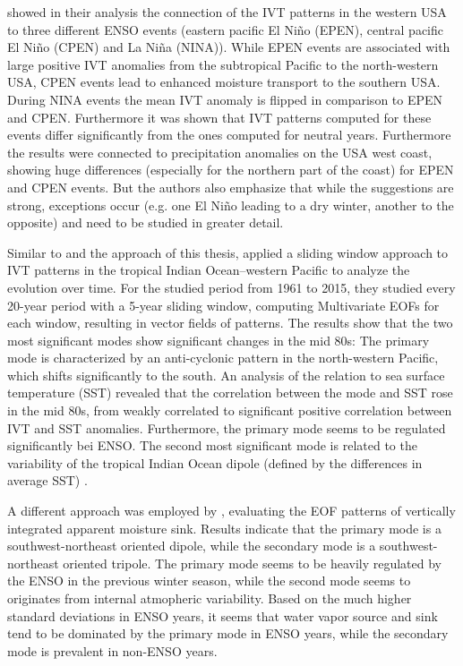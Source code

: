 \citeauthor{kim_ensos_2015} showed in their analysis the connection of the IVT patterns in the western USA to three different ENSO events (eastern pacific El Niño (EPEN), central pacific El Niño (CPEN) and La Niña (NINA)). 
While EPEN events are associated with large positive IVT anomalies from the subtropical Pacific to the north-western USA, CPEN events lead to enhanced moisture transport to the southern USA. 
During NINA events the mean IVT anomaly is flipped in comparison to EPEN and CPEN. 
Furthermore it was shown that IVT patterns computed for these events differ significantly from the ones computed for neutral years.
Furthermore the results were connected to precipitation anomalies on the USA west coast, showing huge differences (especially for the northern part of the coast) for EPEN and CPEN events. 
But the authors also emphasize that while the suggestions are strong, exceptions occur (e.g. one El Niño leading to a dry winter, another to the opposite) and need to be studied in greater detail.

Similar to \cite{vietinghoff_visual_2021} and the approach of this thesis, \citeauthor{zou_interdecadal_2018} applied a sliding window approach to IVT patterns in the tropical Indian Ocean–western Pacific to analyze the evolution over time. 
For the studied period from 1961 to 2015, they studied every 20-year period with a 5-year sliding window, computing Multivariate EOFs for each window, resulting in vector fields of patterns. 
The results show that the two most significant modes show significant changes in the mid 80s: The primary mode is characterized by an anti-cyclonic pattern in the north-western Pacific, which shifts significantly to the south. 
An analysis of the relation to sea surface temperature (SST) revealed that the correlation between the mode and SST rose in the mid 80s, from weakly correlated to significant positive correlation between IVT and SST anomalies. 
Furthermore, the primary mode seems to be regulated significantly bei ENSO. 
The second most significant mode is related to the variability of the tropical Indian Ocean dipole (defined by the differences in average SST) \cite{zou_interdecadal_2018}.

A different approach was employed by \cite{zou_investigating_2020}, evaluating the EOF patterns of vertically integrated apparent moisture sink. 
Results indicate that the primary mode is a southwest-northeast oriented dipole, while the secondary mode is a southwest-northeast oriented tripole. 
The primary mode seems to be heavily regulated by the ENSO in the previous winter season, while the second mode seems to originates from internal atmopheric variability. 
Based on the much higher standard deviations in ENSO years, it seems that water vapor source and sink tend to be dominated by the primary mode in ENSO years, while the secondary mode is prevalent in non-ENSO years. 



